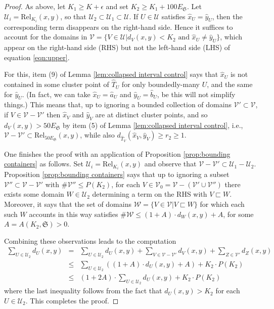 \documentclass{amsart}
\theoremstyle{definition}
\theoremstyle{remark}
\theoremstyle{definition}
\newcommand{\calU}{\mathcal{U}}
\newcommand{\calV}{\mathcal{V}}
\newcommand{\calW}{\mathcal{W}}
\newcommand{\hT}{\widehat{T}}
\newcommand{\hx}{\hat{x}}
\newcommand{\ha}{\hat{a}}
\newcommand{\hb}{\hat{b}}
\newcommand{\hy}{\hat{y}}
\newcommand{\ES}{E_{\mathfrak S}}
\newcommand{\Rel}{\mathrm{Rel}}
\newcommand{\nest}{\sqsubset}
\begin{document}
\begin{proof}

As above, let $K_1 \geq K + \epsilon$ and set $K_2 \geq K_1 + 100\ES$.  Let $\calU_i = \Rel_{K_i}(x,y)$, so that $\calU_2 \subset \calU_1 \subset \calU$.  If $U \in \calU$ satisfies $\hx_U = \hy_U$, then the corresponding term disappears on the right-hand side.  Hence it suffices to account for the domains in $\calV = \{V \in \calU | d_V(x,y) < K_2 \textrm{ and } \hx_U \neq \hy_U\}$, which appear on the right-hand side (RHS) but not the left-hand side (LHS) of equation \eqref{eqn:upper}.

For this, item (9) of Lemma \ref{lem:collapsed interval control} says that $\hx_U$ is not contained in some cluster point of $\hT_U$ for only boundedly-many $U$, and the same for $\hy_U$.  (In fact, we can take $\hx_U = \ha_U$ and $\hy_U = \hb_U$, be this will not simplify things.) This means that, up to ignoring a bounded collection of domains $\calV' \subset \calV$, if $V \in \calV - \calV'$ then $\hx_V$ and $\hy_V$ are at distinct cluster points, and so $d_V(x,y) > 50\ES$ by item (5) of Lemma \ref{lem:collapsed interval control}, i.e., $\calV-\calV' \subset \Rel_{50\ES}(x,y)$, while also $d_{\hT_V}(\hx_V,\hy_V) \geq r_2 \geq 1$.

One finishes the proof with an application of Proposition \ref{prop:bounding containers} as follows.  Set $\calU_i = \Rel_{K_i}(x,y)$ and observe that $\calV - \calV' \subset \calU_1 - \calU_2$.  Proposition \ref{prop:bounding containers} says that up to ignoring a subset $\calV'' \subset \calV - \calV'$ with $\#\calV'' \leq P(K_2)$, for each $V \in \calV_0 = \calV - (\calV' \cup \calV'')$ there exists some domain $W \in \calU_2$ determining a term on the RHS with $V \nest W$.  Moreover, it says that the set of domains $\calW = \{V \in \calV| V\nest W\}$ for which each such $W$ accounts in this way satisfies $\#\calW \leq (1+A)\cdot d_W(x,y) + A$, for some $A = A(K_2, \mathfrak S)>0$.

Combining these observations leads to the computation
\begin{eqnarray*}
\sum_{U \in \calU_2} d_U(x,y) &=& \sum_{U \in \calU_2} d_U(x,y) + \sum_{V \in \calV - \calV'} d_V(x,y)+ \sum_{Z \in \calV'} d_Z(x,y)\\
&\leq& \sum_{U \in \calU_2} ((1+A)\cdot d_U(x,y)+A) + K_2 \cdot P(K_2)\\
&\leq& (1+2A)\cdot \sum_{U \in \calU_2} d_U(x,y) + K_2 \cdot P(K_2)
\end{eqnarray*}
where the last inequality follows from the fact that $d_U(x,y) > K_2$ for each $U \in \calU_2$.  This completes the proof. 

\end{proof}
\end{document}

